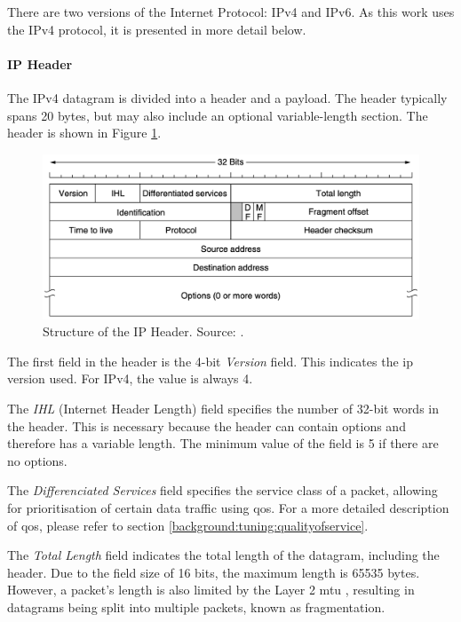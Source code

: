 There are two versions of the Internet Protocol: IPv4 and IPv6. As this work uses the IPv4 protocol, it is presented in more detail below.

\paragraph{IP Header} \label{chap:ipheader}

The IPv4 datagram is divided into a header and a payload. The header typically spans 20 bytes, but may also include an optional variable-length section. The header is shown in Figure \ref{fig:IPHeader}.

\begin{figure}[h]
    \centering
    \includegraphics[width=1\linewidth]{figures/tcpip_refmodel/image7.png}
    \caption[Structure of the IP Header]{Structure of the IP Header. Source: \cite{Tanenbaum2010}.}
    \label{fig:IPHeader}
\end{figure}

The first field in the header is the 4-bit \textit{Version} field. This indicates the \ac{ip} version used. For IPv4, the value is always 4.

The \textit{IHL} (Internet Header Length) field specifies the number of 32-bit words in the header. This is necessary because the header can contain options and therefore has a variable length. The minimum value of the field is 5 if there are no options.

The \textit{Differenciated Services} field specifies the service class of a packet, allowing for prioritisation of certain data traffic using \ac{qos}. For a more detailed description of \ac{qos}, please refer to section \ref{background:tuning:qualityofservice}.

The \textit{Total Length} field indicates the total length of the datagram, including the header. Due to the field size of 16 bits, the maximum length is 65535 bytes. However, a packet's length is also limited by the Layer 2 \ac{mtu} \cite{Weigel2021}, resulting in datagrams being split into multiple packets, known as fragmentation. 

